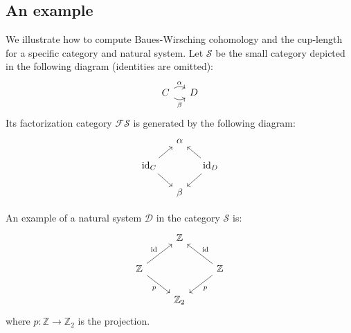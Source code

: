 \documentclass[12pt,reqno]{amsart}
\theoremstyle{definition}
\theoremstyle{remark}
\numberwithin{figure}{section}%
\newcommand{\Si}{\mathcal{S}}
\newcommand{\id}{\mathrm{id}}
\begin{document}
\subsection{An example}\label{subsec:example}
We illustrate how to compute Baues-Wirsching cohomology and the cup-length for a specific category and natural system. 
    Let $\Si$ be the small category depicted in  the following diagram (identities are omitted):
    $$\begin{tikzcd}[column sep=12pt, row sep=12pt]    %
C \arrow[r, "\alpha", bend left] \arrow[r, "\beta"', bend right] & D
\end{tikzcd}
$$
    Its factorization category $\mathcal{FS}$ is generated by the following diagram:
    $$
\begin{tikzcd}[column sep=12pt, row sep=12pt] 
 & \alpha &\\
\id_C \arrow[rd] \arrow[ru] &        & \id_D \arrow[lu] \arrow[ld] \\
& \beta  &                            
\end{tikzcd}$$

An example of a natural system $\mathcal{D}$ in the category $\Si$ is:
    $$
\begin{tikzcd}
                                              & \mathbb{Z}   &                                               \\
\mathbb{Z} \arrow[rd, "p"'] \arrow[ru, "\id"] &              & \mathbb{Z} \arrow[lu, "\id"'] \arrow[ld, "p"] \\
                                              & \mathbb{Z}_2 &                                              
\end{tikzcd}
$$
where $p\colon \mathbb{Z} \rightarrow \mathbb{Z}_2$ is the projection.
\end{document}

